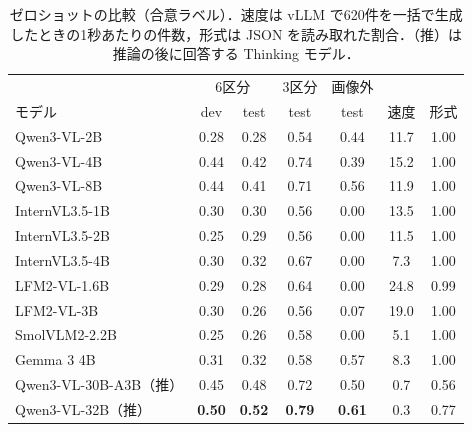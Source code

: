 \begin{table}[t]
    \centering
    \caption{ゼロショットの比較（合意ラベル）．速度は vLLM で620件を一括で生成したときの1秒あたりの件数，形式は JSON を読み取れた割合．（推）は推論の後に回答する Thinking モデル．}
    \label{tab_zeroshot}
    \footnotesize
    \setlength{\tabcolsep}{1.8pt}
    \begin{tabular}{@{}lcccccc@{}}
        \toprule
        & \multicolumn{2}{c}{6区分} & 3区分 & 画像外 & & \\
        モデル & dev & test & test & test & 速度 & 形式 \\
        \midrule
        Qwen3-VL-2B & 0.28 & 0.28 & 0.54 & 0.44 & 11.7 & 1.00 \\
        Qwen3-VL-4B & 0.44 & 0.42 & 0.74 & 0.39 & 15.2 & 1.00 \\
        Qwen3-VL-8B & 0.44 & 0.41 & 0.71 & 0.56 & 11.9 & 1.00 \\
        InternVL3.5-1B & 0.30 & 0.30 & 0.56 & 0.00 & 13.5 & 1.00 \\
        InternVL3.5-2B & 0.25 & 0.29 & 0.56 & 0.00 & 11.5 & 1.00 \\
        InternVL3.5-4B & 0.30 & 0.32 & 0.67 & 0.00 & 7.3 & 1.00 \\
        LFM2-VL-1.6B & 0.29 & 0.28 & 0.64 & 0.00 & 24.8 & 0.99 \\
        LFM2-VL-3B & 0.30 & 0.26 & 0.56 & 0.07 & 19.0 & 1.00 \\
        SmolVLM2-2.2B & 0.25 & 0.26 & 0.58 & 0.00 & 5.1 & 1.00 \\
        Gemma 3 4B & 0.31 & 0.32 & 0.58 & 0.57 & 8.3 & 1.00 \\
        Qwen3-VL-30B-A3B（推） & 0.45 & 0.48 & 0.72 & 0.50 & 0.7 & 0.56 \\
        Qwen3-VL-32B（推） & \textbf{0.50} & \textbf{0.52} & \textbf{0.79} & \textbf{0.61} & 0.3 & 0.77 \\
        \bottomrule
    \end{tabular}
\end{table}

